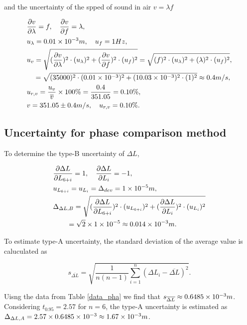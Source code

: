and the uncertainty of the spped of sound in air $v=\lambda f$

\[
\begin{split}
    &\frac{\partial v}{\partial \lambda}=f,\quad \frac{\partial v}{\partial
      f}=\lambda,\\ 
    &u_{\lambda}=0.01\times 10^{-3}m,\quad u_{f}=1Hz,\\
    &u_{v}=\sqrt{(\frac{\partial v}{\partial \lambda})^2\cdot
      (u_{\lambda})^2+(\frac{\partial v}{\partial f})^2\cdot
      (u_{f})^2}=\sqrt{(f)^2\cdot (u_{\lambda})^2+(\lambda)^2\cdot
      (u_{f})^2},\\ 
    &\quad =\sqrt{(35000)^2\cdot(0.01\times 10^{-3})^2+(10.03\times 10^{-3})^2\cdot(1)^2}
    \approx0.4m/s,\\
    &u_{r,v}=\frac{u_v}{\overline{v}}\times 100\%=\frac{0.4}{351.05}=0.10\%,\\
    &v=351.05\pm0.4 m/s,\quad u_{r,v}=0.10\%.
\end{split}
\]

\subsection{Uncertainty for phase comparison method}

To determine the type-B uncertainty of $\Delta L$,

\[
\begin{split}
    &\frac{\partial \Delta L}{\partial L_{6+i}}=1,\quad \frac{\partial
      \Delta L}{\partial L_i}=-1,\\ 
    &u_{L_{6+i}}=u_{L_i}=\Delta_{dev}=1\times 10^{-5}m,\\
    &\Delta_{\Delta L,B}=\sqrt{(\frac{\partial \Delta L}{\partial
        L_{6+i}})^2\cdot (u_{L_{6+i}})^2+(\frac{\partial \Delta L}{\partial
        L_i})^2\cdot (u_{L_i})^2}\\ 
    &\quad\quad =\sqrt{2}\times 1\times 10^{-5}\approx0.014\times 10^{-3}m.\\ 
\end{split}
\]

To estimate type-A uncertainty, the standard deviation of the average value is caluculated as

\[
    s_{\overline{\Delta L}}=\sqrt{\frac{1}{n(n-1)}\sum_{i=1}^n(\Delta
      L_i-\overline{\Delta L})^2}. 
\]

Uisng the data from Table \ref{data_pha} we find that $s_{\overline{\Delta
    L}}\approx 0.6485\times 10^{-3}m$. Considering $t_{0.95}=2.57$ for $n=6$, the
type-A uncertainty is estimated as $\Delta_{\Delta
  L,A}=2.57\times0.6485\times 10^{-3}\approx 1.67\times 10^{-3}m$. 

